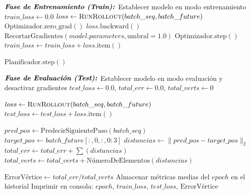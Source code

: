 \begin{algorithm}[H]
\caption{Bucle de Entrenamiento y Validación}
\label{alg:trainingloop}
\begin{algorithmic}

\State {} {
    \BlankLine
    \State $\textbf{\textit{Fase de Entrenamiento (Train):}}$
    \State Establecer modelo en modo entrenamiento
    \State $train\_loss \gets 0.0$
    \State {} {
        \State $loss \gets \textsc{RunRollout}(batch\_seq, batch\_future)$
        \State $\text{Optimizador.zero\_grad}()$
        \State $loss.\text{backward}()$
        \State $\text{RecortarGradientes}(model.parameters, \text{umbral}=1.0)$
        \State $\text{Optimizador.step}()$
        \State $train\_loss \gets train\_loss + loss.\text{item}()$
    }

    \State $\text{Planificador.step}()$ 
    
    \BlankLine
    \State $\textbf{\textit{Fase de Evaluación (Test):}}$
    \State Establecer modelo en modo evaluación y desactivar gradientes
    \State $test\_loss \gets 0.0$, $total\_err \gets 0.0$, $total\_verts \gets 0$

    \State {} {
        \State $loss \gets \textsc{RunRollout}(batch\_seq, batch\_future)$
        \State $test\_loss \gets test\_loss + loss.\text{item}()$
        
        \State $pred\_pos \gets \text{PredecirSiguientePaso}(batch\_seq)$
        \State $target\_pos \gets batch\_future[:, 0, :, 0:3]$
        \State $distancias \gets \|pred\_pos - target\_pos\|_2$
        \State $total\_err \gets total\_err + \sum(distancias)$
        \State $total\_verts \gets total\_verts + \text{NúmeroDeElementos}(distancias)$
    }
\State $\text{ErrorVértice} \gets total\_err  /  total\_verts$
\State Almacenar métricas medias del $epoch$ en el historial
\State Imprimir en consola: $epoch$, $train\_loss$, $test\_loss$, $\text{ErrorVértice}$
}

\end{algorithmic}
\end{algorithm}


